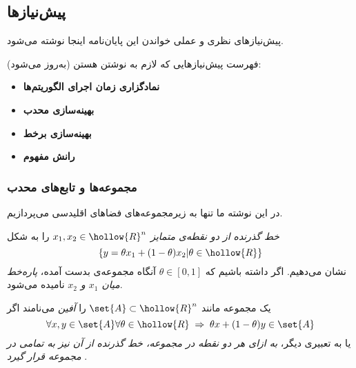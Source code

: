 \subsection{
پیش‌نیازها
}

پیش‌نیازهای نظری و عملی خواندن این پایان‌نامه اینجا نوشته می‌شود.


فهرست پیش‌نیازهایی که لازم به نوشتن هستن (به‌روز می‌شود):
\begin{itemize}
\item {\bf
نمادگزاری زمان اجرای الگوریتم‌ها
}


\item {\bf
بهینه‌سازی محدب
}

\item {\bf
بهینه‌سازی برخط
}

\item {\bf
رانش مفهوم
}

\end{itemize}












\subsubsection{
مجموعه‌ها و تابع‌های محدب
}
در این نوشته ما تنها به زیرمجموعه‌های فضاهای اقلیدسی می‌پردازیم.

\textit{
خط گذرنده از دو نقطه‌ی متمایز
$x_1, x_2 \in \hollow{R}^n$}
را به شکل
\[
\left\lbrace y = \theta x_1 + (1 - \theta ) x_2 | \theta \in \hollow{R} \right\rbrace
\]
نشان می‌دهیم. اگر داشته باشیم که
$\theta \in [0,1]$
آنگاه مجموعه‌ی بدست آمده،
\textit{
پاره‌خط میان
$x_1$
و
$x_2$}
نامیده می‌شود.


یک مجموعه مانند
$\set{A} \subset \hollow{R}^n$
را
\textit{
آفین
}
می‌نامند اگر
\[
\forall x,y \in \set{A} \forall \theta \in \hollow{R} \; \Rightarrow \; \theta x + (1-\theta) y \in \set{A}
\]
یا به تعبیری دیگر،
\textit{
به ازای هر دو نقطه در مجموعه، خط گذرنده از آن نیز به تمامی در مجموعه قرار گیرد
}.

